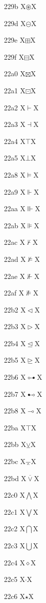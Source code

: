 \documentclass[11pt]{article}
\begin{document}
229b X{\ensuremath{\circledast}}X

229d X{\ensuremath{\circleddash}}X

229e X{\ensuremath{\boxplus}}X

229f X{\ensuremath{\boxminus}}X

22a0 X{\ensuremath{\boxtimes}}X

22a1 X{\ensuremath{\boxdot}}X

22a2 X{\ensuremath{\vdash}}X

22a3 X{\ensuremath{\dashv}}X

22a4 X{\ensuremath{\top}}X

22a5 X{\ensuremath{\bot}}X

22a8 X{\ensuremath{\vDash}}X

22a9 X{\ensuremath{\Vdash}}X

22aa X{\ensuremath{\Vvdash}}X

22ab X{\ensuremath{\VDash}}X

22ac X{\ensuremath{\nvdash}}X

22ad X{\ensuremath{\nvDash}}X

22ae X{\ensuremath{\nVdash}}X

22af X{\ensuremath{\nVDash}}X

22b2 X{\ensuremath{\vartriangleleft}}X

22b3 X{\ensuremath{\vartriangleright}}X

22b4 X{\ensuremath{\trianglelefteq}}X

22b5 X{\ensuremath{\trianglerighteq}}X

22b6 X{\ensuremath{\multimapdotbothA}}X

22b7 X{\ensuremath{\multimapdotbothB}}X

22b8 X{\ensuremath{\multimap}}X

22ba X{\ensuremath{\intercal}}X

22bb X{\ensuremath{\veebar}}X

22bc X{\ensuremath{\barwedge}}X

22bd X{\ensuremath{\overline{\vee}}}X

22c0 X{\ensuremath{\bigwedge}}X

22c1 X{\ensuremath{\bigvee}}X

22c2 X{\ensuremath{\bigcap}}X

22c3 X{\ensuremath{\bigcup}}X

22c4 X{\ensuremath{\diamond}}X

22c5 X{\ensuremath{\cdot}}X

22c6 X{\ensuremath{\star}}X
\end{document}
